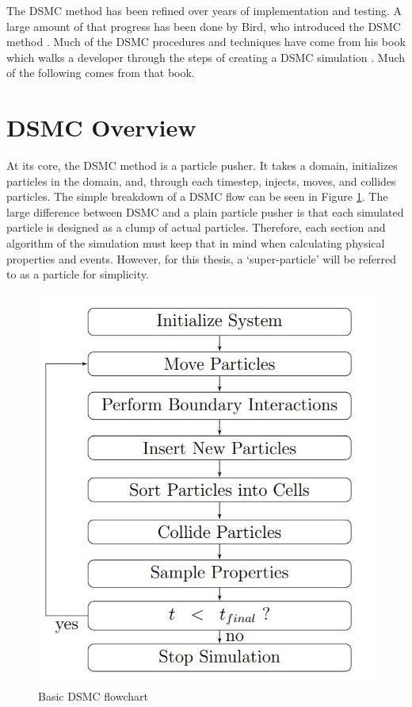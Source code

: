 The DSMC method has been refined over years of implementation and testing. A large amount of that progress has been done by Bird, who introduced the DSMC method \cite{bird_76}. Much of the DSMC procedures and techniques have come from his book which walks a developer through the steps of creating a DSMC simulation \cite{bird_dsmc}. Much of the following comes from that book. \par

\section{DSMC Overview}

\indent At its core, the DSMC method is a particle pusher. It takes a domain, initializes particles in the domain, and, through each timestep, injects, moves, and collides particles. The simple breakdown of a DSMC flow can be seen in Figure \ref{fig:dsmc_flow}. The large difference between DSMC and a plain particle pusher is that each simulated particle is designed as a clump of actual particles. Therefore, each section and algorithm of the simulation must keep that in mind when calculating physical properties and events. However, for this thesis, a `super-particle' will be referred to as a particle for simplicity. \par

\begin{figure}
    \includegraphics[width=.5\textwidth]{figures/dsmc_flow.JPG}
    \centering
    \caption[Basic DSMC flowchart]{Basic DSMC flowchart \cite{Galvez2018a}}
    \label{fig:dsmc_flow}
\end{figure}


